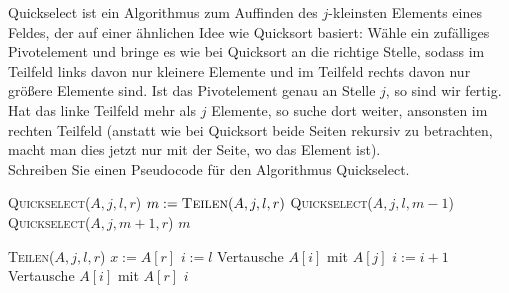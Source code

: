 
\begin{exercise}

Quickselect ist ein Algorithmus zum Auffinden des $j$-kleinsten Elements eines
Feldes, der auf einer ähnlichen Idee wie Quicksort basiert: Wähle ein zufälliges
Pivotelement und bringe es wie bei Quicksort an die richtige Stelle, sodass im
Teilfeld links davon nur kleinere Elemente und im Teilfeld rechts davon nur
größere Elemente sind. Ist das Pivotelement genau an
Stelle $j$, so sind wir fertig. Hat das linke Teilfeld mehr als $j$ Elemente,
so suche dort weiter, ansonsten im rechten Teilfeld (anstatt wie bei Quicksort beide
Seiten rekursiv zu betrachten, macht man dies jetzt nur mit der Seite, wo das Element ist). \\
Schreiben Sie einen Pseudocode für den Algorithmus Quickselect.

\end{exercise}



\begin{solution}

\phantom{}

\begin{algorithmic}[1]
  \State \textsc{Quickselect}($A,j,l,r$)
    \State $m := \textsc{Teilen}(A,j,l,r)$
      \State \textsc{Quickselect}($A,j,l,m-1$)
      \State \textsc{Quickselect}($A,j,m+1,r$)
      \State \Return $m$
    \EndIf
  \EndIf
\end{algorithmic}

\begin{algorithmic}[1]
  \State \textsc{Teilen}($A,j,l,r$)
  \State $x := A[r]$
  \State $i := l$
      \State Vertausche $A[i]$ mit $A[j]$
      \State $i := i + 1$
    \EndIf
  \EndFor
  \State Vertausche $A[i]$ mit $A[r]$
  \State \Return $i$
\end{algorithmic}

\end{solution}
